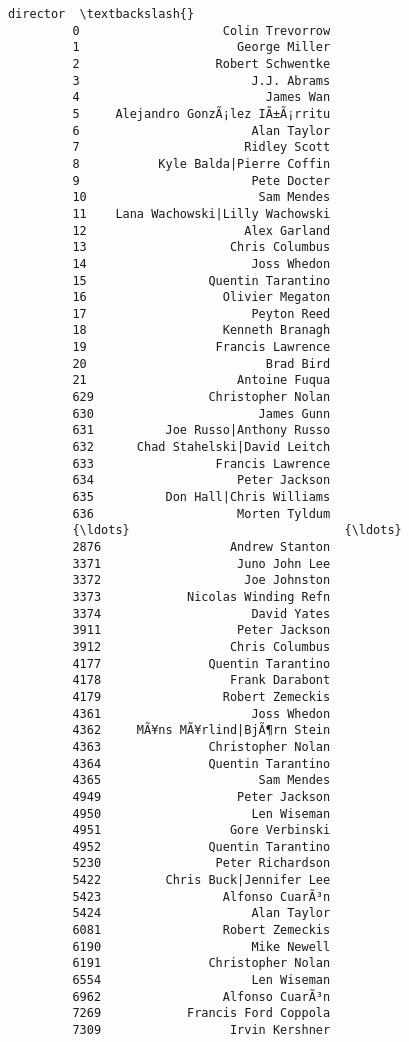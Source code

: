 \documentclass[11pt]{article}
\begin{document}
\begin{Verbatim}[commandchars=\\\{\}]
                                     director  \textbackslash{}
         0                    Colin Trevorrow   
         1                      George Miller   
         2                   Robert Schwentke   
         3                        J.J. Abrams   
         4                          James Wan   
         5     Alejandro GonzÃ¡lez IÃ±Ã¡rritu   
         6                        Alan Taylor   
         7                       Ridley Scott   
         8           Kyle Balda|Pierre Coffin   
         9                        Pete Docter   
         10                        Sam Mendes   
         11    Lana Wachowski|Lilly Wachowski   
         12                      Alex Garland   
         13                    Chris Columbus   
         14                       Joss Whedon   
         15                 Quentin Tarantino   
         16                   Olivier Megaton   
         17                       Peyton Reed   
         18                   Kenneth Branagh   
         19                  Francis Lawrence   
         20                         Brad Bird   
         21                     Antoine Fuqua   
         629                Christopher Nolan   
         630                       James Gunn   
         631          Joe Russo|Anthony Russo   
         632      Chad Stahelski|David Leitch   
         633                 Francis Lawrence   
         634                    Peter Jackson   
         635          Don Hall|Chris Williams   
         636                    Morten Tyldum   
         {\ldots}                              {\ldots}   
         2876                  Andrew Stanton   
         3371                   Juno John Lee   
         3372                    Joe Johnston   
         3373            Nicolas Winding Refn   
         3374                     David Yates   
         3911                   Peter Jackson   
         3912                  Chris Columbus   
         4177               Quentin Tarantino   
         4178                  Frank Darabont   
         4179                 Robert Zemeckis   
         4361                     Joss Whedon   
         4362     MÃ¥ns MÃ¥rlind|BjÃ¶rn Stein   
         4363               Christopher Nolan   
         4364               Quentin Tarantino   
         4365                      Sam Mendes   
         4949                   Peter Jackson   
         4950                     Len Wiseman   
         4951                  Gore Verbinski   
         4952               Quentin Tarantino   
         5230                Peter Richardson   
         5422         Chris Buck|Jennifer Lee   
         5423                 Alfonso CuarÃ³n   
         5424                     Alan Taylor   
         6081                 Robert Zemeckis   
         6190                     Mike Newell   
         6191               Christopher Nolan   
         6554                     Len Wiseman   
         6962                 Alfonso CuarÃ³n   
         7269            Francis Ford Coppola   
         7309                  Irvin Kershner   
         

\end{Verbatim}
\end{document}
